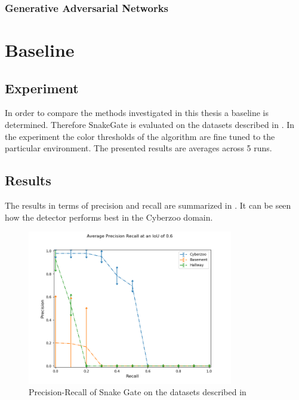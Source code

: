 \subsubsection{Generative Adversarial Networks}

\cite{Inoue} 





\section{Baseline}


\subsection{Experiment}

In order to compare the methods investigated in this thesis a baseline is determined. Therefore SnakeGate is evaluated on the datasets described in . In the experiment the color thresholds of the algorithm are fine tuned to the particular environment. The presented results are averages across 5 runs.


\subsection{Results}

The results in terms of precision and recall are summarized in . It can be seen how the detector performs best in the Cyberzoo domain.

\begin{figure}
	\includegraphics[width=0.8\textwidth]{fig/snake_results_real}
	\caption{Precision-Recall of Snake Gate on the datasets described in }
	\label{fig:snake_results_real}
\end{figure}

